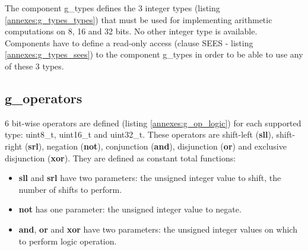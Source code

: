 The component g\_types defines the 3 integer types (listing \ref{annexes:g_types_types}) that must be used for implementing arithmetic computations on 8, 16 and 32 bits. No other integer type is available.\\
Components have to define a read-only access (clause SEES - listing \ref{annexes:g_types_sees}) to the component g\_types in order to be able to use any of these 3 types.


\subsection{g\_operators}

6 bit-wise operators are defined (listing \ref{annexes:g_op_logic}) for each supported type: uint8\_t, uint16\_t and uint32\_t. These operators are shift-left (\textbf{sll}), shift-right (\textbf{srl}), negation (\textbf{not}), conjunction (\textbf{and}), disjunction (\textbf{or}) and exclusive disjunction (\textbf{xor}). They are defined as constant total functions: 
\begin{itemize}
    \item \textbf{sll} and \textbf{srl} have two parameters: the unsigned integer value to shift, the number of shifts to perform.
    \item \textbf{not} has one parameter: the unsigned integer value to negate.
    \item \textbf{and}, \textbf{or} and \textbf{xor} have two parameters: the unsigned integer values on which to perform logic operation.
\end{itemize}

